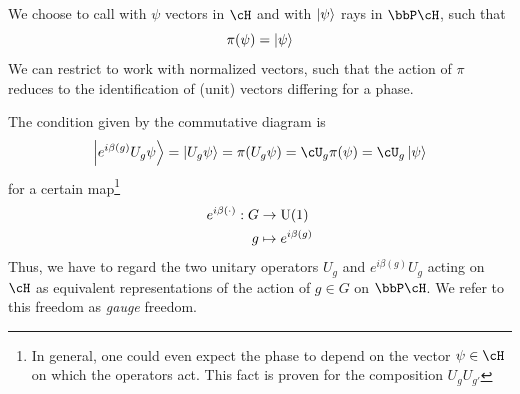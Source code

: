 We choose to call with $\psi$ vectors in $\cH$ and with $\ket{\psi}$ rays in $\bbP \cH$, such that
\begin{equation}
    \pi ( \psi) = \ket{\psi}
\end{equation}
We can restrict to work with normalized vectors, such that the action of $\pi$ reduces to the identification of (unit) vectors differing for a phase.
 
The condition given by the commutative diagram is
\begin{equation}
	\ket{ e^{i \beta(g)} U_g \psi } = \ket{U_{g} \psi} = \pi ( U_g \psi )  = \cU_g \pi (\psi) =   \cU_g  \ket{\psi} 
\end{equation}
for a certain map\footnote{In general, one could even expect the phase to depend on the vector $\psi \in \cH$ on which the operators act. This fact is proven for the composition $U_g U_{g'}$ }
\begin{equation}
    \begin{aligned}
        e^{i \beta(\cdot)} : G &\to \mathrm{U}(1)\\
        g &\mapsto e^{i \beta(g)}
    \end{aligned}
\end{equation}
Thus, we have to regard the two unitary operators $U_g$ and $e^{i \beta(g)} U_g$ acting on $\cH$ as equivalent representations of the action of $g \in G$ on $\bbP\cH$. We refer to this freedom as \textit{gauge} freedom. 

